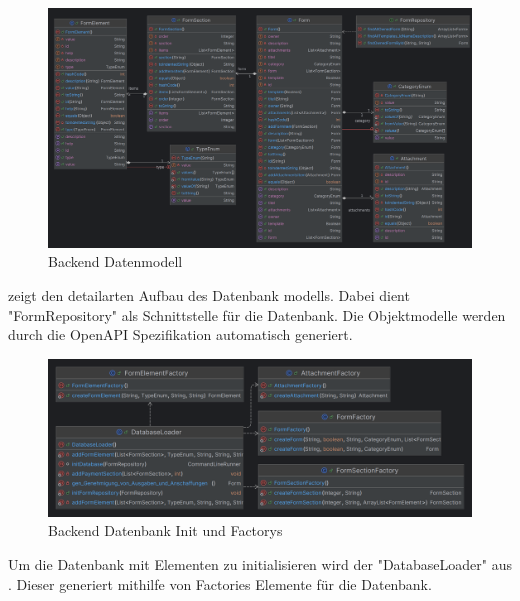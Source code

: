 \begin{figure}[H]
    \centering
    \includegraphics[width=20cm,angle=90,origin=c]{images/classDiagrams/FormRepository}
    \caption{Backend Datenmodell}\label{fig:backendclass-diagram}
\end{figure}

 zeigt den detailarten Aufbau des Datenbank modells.
Dabei dient "FormRepository" als Schnittstelle für die Datenbank.
Die Objektmodelle werden durch die OpenAPI Spezifikation automatisch generiert.

\begin{figure}[H]
    \centering
    \includegraphics[width=15cm]{images/classDiagrams/DatabaseLoader}
    \caption{Backend Datenbank Init und Factorys}\label{fig:backend-gen-class-diagram}
\end{figure}

Um die Datenbank mit Elementen zu initialisieren wird der "DatabaseLoader" aus .
Dieser generiert mithilfe von Factories Elemente für die Datenbank.

